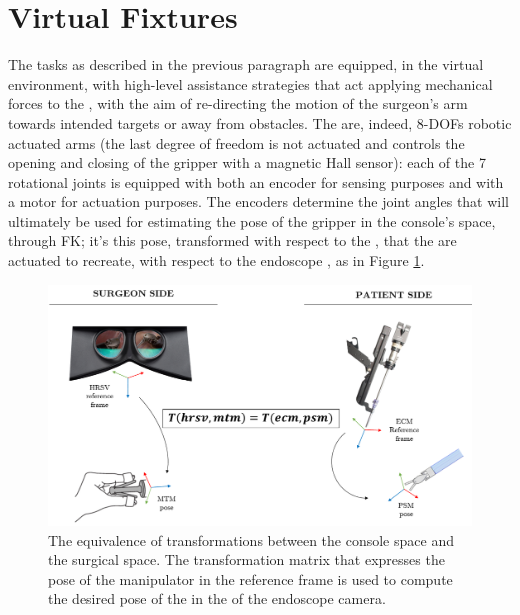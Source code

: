 \documentclass[../main.tex]{subfiles}
\begin{document}
\section{Virtual Fixtures}
The tasks as described in the previous paragraph are equipped, in the virtual environment, with high-level assistance strategies that act applying mechanical forces to the \mtms, with the aim of re-directing the motion of the surgeon's arm towards intended targets or away from obstacles. The \mtms are, indeed, 8-DOFs robotic actuated arms (the last degree of freedom is not actuated and controls the opening and closing of the gripper with a magnetic Hall sensor): each of the 7 rotational joints is equipped with both an encoder for sensing purposes and with a motor for actuation purposes. The encoders determine the joint angles that will ultimately be used for estimating the pose of the gripper in the console's space, through FK; it's this pose, transformed with respect to the \hrsv \rf, that the \psms are actuated to recreate, with respect to the endoscope \rf, as in Figure \ref{fig:consoletocarttransform}. 

\begin{figure}[h]
    \centering
    \includegraphics[width=\textwidth]{images/console_to_cart_transform.png}
    \caption{The equivalence of transformations between the console space and the surgical space. The transformation matrix that expresses the pose of the manipulator in the \hrsv reference frame is used to compute the desired pose of the \psm in the \rf of the endoscope camera.}
    \label{fig:consoletocarttransform}
\end{figure}
\end{document}
